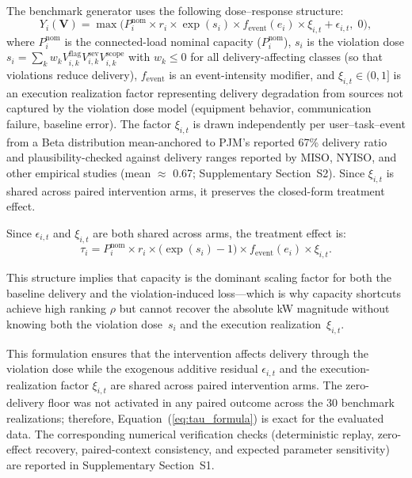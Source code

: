 \documentclass[utf8]{FrontiersinHarvard}
\begin{document}
The benchmark generator uses the following dose--response
structure:
\begin{equation}
    Y_i(\mathbf{V}) = \max\!\bigl(P_i^{\mathrm{nom}} \times
    r_i \times \exp(s_i) \times f_{\mathrm{event}}(e_i) \times
    \xi_{i,t} + \epsilon_{i,t},\; 0\bigr),
    \label{eq:dose_response}
\end{equation}
where $P_i^{\mathrm{nom}}$ is the connected-load nominal capacity
($P_i^{\mathrm{nom}}$), $s_i$ is
the violation dose
$s_i = \sum_k w_k V_{i,k}^{\mathrm{flag}}
V_{i,k}^{\mathrm{sev}} V_{i,k}^{\mathrm{scope}}$
with $w_k \leq 0$ for all delivery-affecting classes
(so that violations reduce delivery),
$f_{\mathrm{event}}$ is an event-intensity modifier,
and $\xi_{i,t} \in (0,1]$ is an execution realization factor
representing delivery degradation from sources not captured by
the violation dose model (equipment behavior, communication
failure, baseline error). The factor $\xi_{i,t}$ is drawn
independently per user--task--event from a Beta distribution
mean-anchored to PJM's reported 67\% delivery ratio and
plausibility-checked against delivery ranges reported by
MISO, NYISO, and other empirical studies
(mean $\approx$ 0.67; Supplementary Section~S2).
Since $\xi_{i,t}$ is shared across paired intervention arms, it
preserves the closed-form treatment effect.

Since $\epsilon_{i,t}$ and $\xi_{i,t}$ are both shared across arms, the
treatment effect is:
\begin{equation}
    \tau_i = P_i^{\mathrm{nom}} \times r_i \times
    \bigl(\exp(s_i) - 1\bigr) \times f_{\mathrm{event}}(e_i)
    \times \xi_{i,t}.
    \label{eq:tau_formula}
\end{equation}

This structure implies that capacity is the dominant scaling
factor for both the baseline delivery and the violation-induced
loss---which is why capacity shortcuts achieve high ranking
$\rho$ but cannot recover the absolute kW magnitude without
knowing both the violation dose~$s_i$ and the execution
realization~$\xi_{i,t}$.

This formulation ensures that the intervention affects delivery
through the violation dose while the exogenous additive residual
$\epsilon_{i,t}$ and the execution-realization factor $\xi_{i,t}$
are shared across paired intervention arms. The zero-delivery
floor was not activated in any paired outcome across the 30
benchmark realizations; therefore, Equation~(\ref{eq:tau_formula})
is exact for the evaluated data. The corresponding numerical
verification checks (deterministic
replay, zero-effect recovery, paired-context consistency, and
expected parameter sensitivity) are reported in Supplementary
Section~S1.
\end{document}
